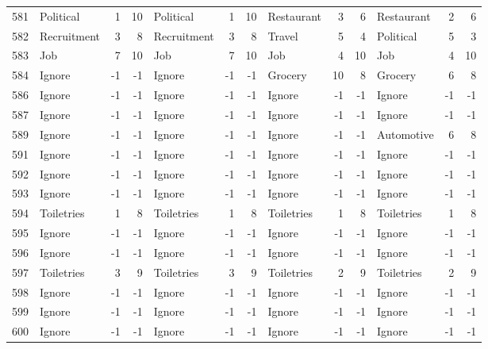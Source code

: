 \begin{figure}[htbp]
\begin{tabular}{rlrrlrrlrrlrr}
    581   & Political & 1     & 10    & Political & 1     & 10    & Restaurant & 3     & 6     & Restaurant & 2     & 6 \\
    582   & Recruitment & 3     & 8     & Recruitment & 3     & 8     & Travel & 5     & 4     & Political & 5     & 3 \\
    583   & Job   & 7     & 10    & Job   & 7     & 10    & Job   & 4     & 10    & Job   & 4     & 10 \\
    584   & Ignore & -1    & -1    & Ignore & -1    & -1    & Grocery & 10    & 8     & Grocery & 6     & 8 \\
    586   & Ignore & -1    & -1    & Ignore & -1    & -1    & Ignore & -1    & -1    & Ignore & -1    & -1 \\
    587   & Ignore & -1    & -1    & Ignore & -1    & -1    & Ignore & -1    & -1    & Ignore & -1    & -1 \\
    589   & Ignore & -1    & -1    & Ignore & -1    & -1    & Ignore & -1    & -1    & Automotive & 6     & 8 \\
    591   & Ignore & -1    & -1    & Ignore & -1    & -1    & Ignore & -1    & -1    & Ignore & -1    & -1 \\
    592   & Ignore & -1    & -1    & Ignore & -1    & -1    & Ignore & -1    & -1    & Ignore & -1    & -1 \\
    593   & Ignore & -1    & -1    & Ignore & -1    & -1    & Ignore & -1    & -1    & Ignore & -1    & -1 \\
    594   & Toiletries & 1     & 8     & Toiletries & 1     & 8     & Toiletries & 1     & 8     & Toiletries & 1     & 8 \\
    595   & Ignore & -1    & -1    & Ignore & -1    & -1    & Ignore & -1    & -1    & Ignore & -1    & -1 \\
    596   & Ignore & -1    & -1    & Ignore & -1    & -1    & Ignore & -1    & -1    & Ignore & -1    & -1 \\
    597   & Toiletries & 3     & 9     & Toiletries & 3     & 9     & Toiletries & 2     & 9     & Toiletries & 2     & 9 \\
    598   & Ignore & -1    & -1    & Ignore & -1    & -1    & Ignore & -1    & -1    & Ignore & -1    & -1 \\
    599   & Ignore & -1    & -1    & Ignore & -1    & -1    & Ignore & -1    & -1    & Ignore & -1    & -1 \\
    600   & Ignore & -1    & -1    & Ignore & -1    & -1    & Ignore & -1    & -1    & Ignore & -1    & -1 \\

\end{tabular}
\end{figure}
